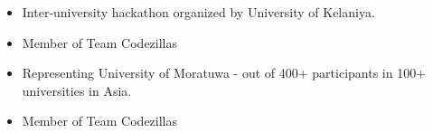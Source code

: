 \documentclass[10pt,a4paper]{altacv}
\begin{document}
{}

\begin{itemize}
\item Inter-university hackathon organized by University of Kelaniya.
\item Member of Team Codezillas
\end{itemize}
\divider

\begin{itemize}
\item Representing University of Moratuwa - out of 400+ participants in 100+ universities in Asia.
\end{itemize}
\divider

\begin{itemize}
\item  Member of Team Codezillas
\end{itemize}



\clearpage
\end{document}

